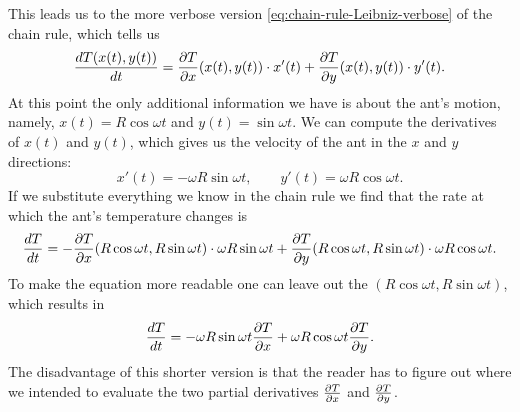 This leads us to the more verbose version \eqref{eq:chain-rule-Leibniz-verbose}
of the chain rule, which tells us
\[
\frac{dT(x(t), y(t))}{dt} = \frac{\partial T}{\partial x}(x(t), y(t))\cdot x'(t) + \frac{\partial T}{\partial y}(x(t),
y(t))\cdot y'(t).
\]
At this point the only additional information we have is about the ant's motion,
namely, $x(t) = R\cos\omega t$ and $y(t) = \sin \omega t$.  We can compute the
derivatives of $x(t)$ and $y(t)$, which gives us the velocity of the ant in the
$x$ and $y$ directions:
\[
x'(t) = -\omega R\sin \omega t, \qquad y'(t) = \omega R\cos\omega t.
\]
If we substitute everything we know in the chain rule we find that the rate at
which the ant's temperature changes is
\[
\frac{dT}{dt} = -\frac{\partial T}{\partial x}(R\cos \omega t, R\sin\omega t)\cdot \omega R\sin \omega
t + \frac{\partial T}{\partial y}(R\cos \omega t, R\sin\omega t)\cdot \omega R \cos\omega t.
\]
To make the equation more readable one can leave out the $(R\cos \omega t,
R\sin\omega t)$, which results in
\[
\frac{dT}{dt} = -\omega R\sin \omega t\frac{\partial T}{\partial x} + \omega R \cos\omega t\frac{\partial T}{\partial y} .
\]
The disadvantage of this shorter version is that the reader has to figure out
where we intended to evaluate the two partial derivatives $\frac{\partial T}{\partial x}$ and $\frac{\partial T}{\partial y}$.

